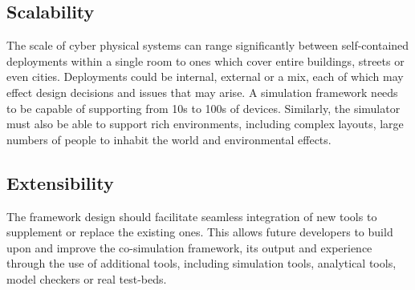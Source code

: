 \subsection{Scalability} %
\label{sub:requirements_scalability}
The scale of cyber physical systems can range significantly between self-contained deployments within a single room to ones which cover entire buildings, streets or even cities. Deployments could be internal, external or a mix, each of which may effect design decisions and issues that may arise. A simulation framework needs to be capable of supporting from 10s to 100s of devices. Similarly, the simulator must also be able to support rich environments, including complex layouts, large numbers of people to inhabit the world and environmental effects.



\subsection{Extensibility} %
\label{sub:requirements_extensibility}
The framework design should facilitate seamless integration of new tools to supplement or replace the existing ones. This allows future developers to build upon and improve the co-simulation framework, its output and experience through the use of additional tools, including simulation tools, analytical tools, model checkers or real test-beds.











